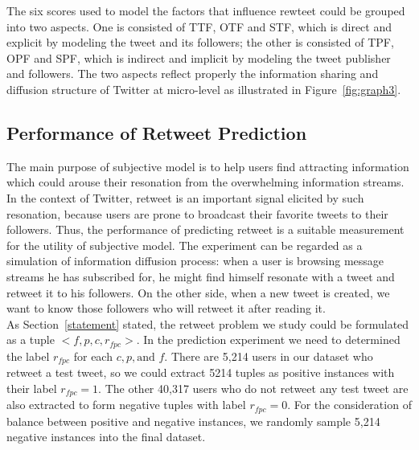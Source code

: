 \documentclass[preprint]{elsarticle}
\begin{document}
The six scores used to model the factors that influence rewteet could be grouped into two aspects. 
One is consisted of TTF, OTF and STF, which is direct and explicit by modeling the tweet and its followers;
the other is consisted of TPF, OPF and SPF, which is indirect and implicit by modeling the tweet publisher and followers.
The two aspects reflect properly the information sharing and diffusion structure of Twitter at micro-level as illustrated in Figure~\ref{fig:graph3}.
\subsection{Performance of Retweet Prediction }
\label{performance}
The main purpose of subjective model is to help users find attracting information which could arouse their resonation from the overwhelming information streams. 
In the context of Twitter, retweet is an important signal elicited by such resonation, because users are prone to broadcast their favorite tweets to their followers. 
Thus, the performance of predicting retweet is a suitable measurement for the utility of subjective model. The experiment can be regarded as a simulation of information diffusion process: when a user is browsing message streams he has subscribed for, he might find himself resonate with a tweet and retweet it to his followers. On the other side, when a new tweet is created, we want to know those followers who will retweet it after reading it.\\
As Section~\ref{statement} stated, the retweet problem we study could be formulated as a tuple $< f, p, c, r_{fpc}> $.
In the prediction experiment we need to determined the label $ r_{fpc} $ for each $ c, p, \text{and } f $. 
There are 5,214 users in our dataset who retweet a test tweet, so we could extract 5214 tuples as positive instances with their label $ r_{fpc}=1 $.
The other 40,317 users who do not retweet any test tweet are also extracted to form negative tuples with label $ r_{fpc}=0 $.
For the consideration of balance between positive and negative instances, we randomly sample 5,214 negative instances into the final dataset.
\end{document}
